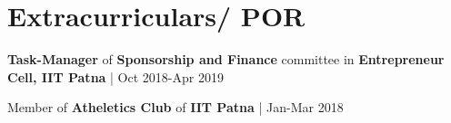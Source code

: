 \documentclass[]{deedy-resume-openfont}
\begin{document}
\begin{minipage}[t]{0.66\textwidth}

\section{Extracurriculars/ POR}
\runsubsection{}
\vspace{\topsep}
\begin{tightemize}
\item \textbf{Task-Manager} of \textbf{Sponsorship and Finance} committee in \textbf{Entrepreneur Cell, IIT Patna} | Oct 2018-Apr 2019
\item Member of \textbf{Atheletics Club} of \textbf{IIT Patna} | Jan-Mar 2018
\end{tightemize} 
\sectionsep

\end{minipage} 
\end{document}
